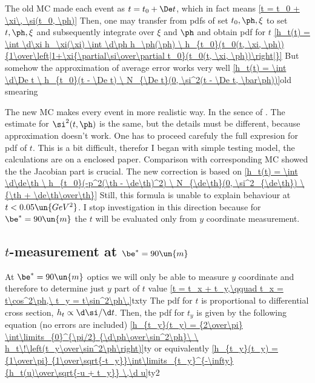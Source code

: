 The old MC made each event as $t = t_0 + \De t$, which in fact means 
\eqref{t = t_0 + \xi\, \si(t_0, \ph)}{}
Then, one may transfer from pdfs of set $t_0, \ph, \xi$ to set $t, \ph, \xi$ and subsequently integrate over $\xi$ and $\ph$ and obtain pdf for $t$
\eqref{h_t(t) = \int \d\xi h_\xi(\xi) \int \d\ph h_\ph(\ph) \ h_{t_0}(t_0(t, \xi, \ph)) {1\over\left|1+\xi{\partial\si\over\partial t_0}(t_0(t, \xi, \ph))\right|}}{}
But somehow the approximation of average error works very well
\eqref{h_t(t) = \int \d\De t \ h_{t_0}(t - \De t) \ N_{\De t}(0, \si^2(t - \De t, \bar\ph))}{old smearing}

The new MC makes every event in more realistic way. In the sence of . The estimate for $\si^2(t, \ph)$ is the same, but the details must be different, because approximation  doesn't work. One has to proceed carefuly the full expresion for pdf of $t$. This is a bit difficult, therefor I began with simple testing model, the calculations are on a enclosed paper. Comparison with corresponding MC showed the the Jacobian part is crucial. The new correction is based on
\eqref{h_t(t) = \int \d\de\th \ h_{t_0}(-p^2(\th - \de\th)^2) \  N_{\de\th}(0, \si^2_{\de\th}) \ {\th + \de\th\over\th}}{}
Still, this formula is unable to explain behaviour at $t < 0.05\un{GeV^2}$. I stop investigation in this direction because for $\be^*=90\un{m}$ the $t$ will be evaluated only from $y$ coordinate measurement.


\bmfig[Difference between theoretical curve and histograms. Blue histogram corresponds to old MC, the others to the new one. Black is $\De=0\un{\mu m}$, red $\De=50\un{\mu m}$ and green $\De=100\un{\mu m}$.]
\emfig


\vfil
\eject


\subsection{$t$-measurement at $\be^*=90\un{m}$}

At $\be^*=90\un{m}$ optics we will only be able to measure $y$ coordinate and therefore to determine just $y$ part of $t$ value
\eqref{t = t_x + t_y,\qquad t_x = t\cos^2\ph,\ t_y = t\sin^2\ph\.}{txty}
The pdf for $t$ is proportional to differential cross section, $h_t \propto \d\si/\d t$. Then, the pdf for $t_y$ is given by the following equation (no errors are included)
\eqref{h_{t_y}(t_y) = {2\over\pi} \int\limits_{0}^{\pi/2} {\d\ph\over\sin^2\ph}\ \ h_t\!\left(t_y\over\sin^2\ph\right)}{ty}
or equivalently
\eqref{h_{t_y}(t_y) = {1\over\pi} {1\over\sqrt{-t_y}}\int\limits_{t_y}^{-\infty} {h_t(u)\over\sqrt{-u + t_y}} \,\d u}{ty2}

